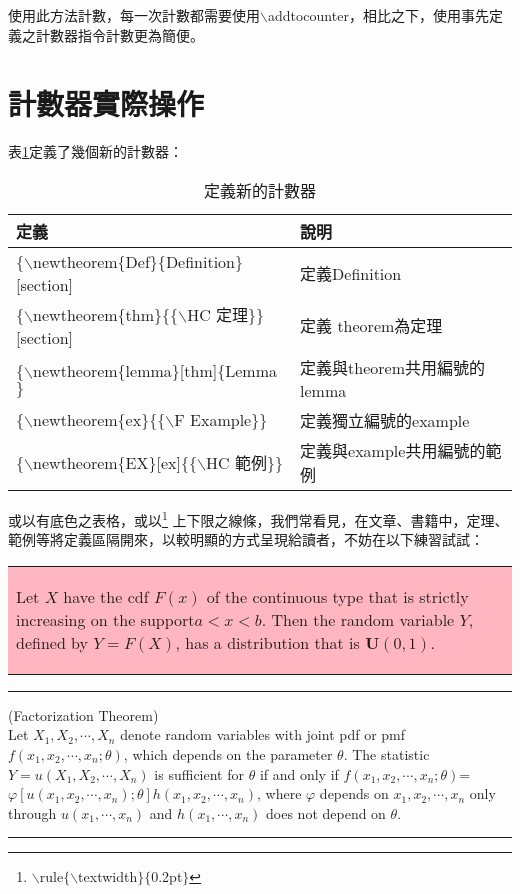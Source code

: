 	\indent 使用此方法計數，每一次計數都需要使用$\backslash$addtocounter，相比之下，使用事先定義之計數器指令計數更為簡便。

\section{\HC 計數器實際操作}
	表\ref{counter_new}定義了幾個新的計數器：
	\begin{table}[H]
	\centering
	\extrarowheight=4pt
	\caption{定義新的計數器}\label{counter_new}
		\begin{tabular}{ll}
		\hline
		定義 & 說明 \\
		\hline
		$\{\backslash$newtheorem$\{$Def$\}\{$Definition$\}$[section]  & 定義Definition \\ 
		\rowcolor{lavendergray}
		$\{\backslash$newtheorem$\{$thm$\}\{\{\backslash$HC 定理$\}\}$[section] & 定義 theorem為定理 \\
		$\{\backslash$newtheorem$\{$lemma$\}$[thm]$\{$Lemma$\}$ & 定義與theorem共用編號的lemma \\
		\rowcolor{lavendergray}
		$\{\backslash$newtheorem$\{$ex$\}\{\{\backslash$F Example$\}\}$ & 定義獨立編號的example \\
		$\{\backslash$newtheorem$\{$EX$\}$[ex]$\{\{\backslash$HC 範例$\}\}$ & 定義與example共用編號的範例 \\
		\hline
		\end{tabular} 
	\end{table}

	\indent 或以有底色之表格，或以\footnote{$\backslash$rule$\{\backslash$textwidth$\}\{$0.2pt$\}$} 上下限之線條，我們常看見，在文章、書籍中，定理、範例等將定義區隔開來，以較明顯的方式呈現給讀者，不妨在以下練習試試：

	\begin{center}
	\colorbox{lightpink}{\begin{tabular}{p{}}
		\begin{thm}\label{ex_theorem}
		Let $X$ have the cdf $F(x)$ of the continuous type that is strictly increasing on the support$ a < x < b $.  Then the random variable  $Y$, defined by $Y = F(X)$, has a distribution that is $\mathbf{U}(0,1)$. 
		\end{thm}
		\end{tabular}}
	\end{center}


	\noindent \rule{\textwidth}{0.2pt}
	\begin{Def}\label{ex_Def}
(Factorization Theorem) \\
Let $X_1,X_2,\cdots,X_n$ denote random variables with joint pdf or pmf $f(x_1,x_2,\cdots,x_n;\theta)$, which depends on the parameter $\theta$. The statistic $Y =u(X_1,X_2,\cdots,X_n)$ is sufficient for $\theta$ if and only if $f(x_1,x_2,\cdots,x_n;\theta)$= $\varphi[u(x_1,x_2,\cdots,x_n);\theta]h(x_1,x_2,\cdots,x_n)$, where $\varphi$ depends on $x_1,x_2,\cdots,x_n$ only through $u(x_1,\cdots,x_n)$ and $h(x_1,\cdots,x_n)$ does not depend on $\theta$.
	\end{Def}
	\noindent \rule{\textwidth}{0.2pt}
	
